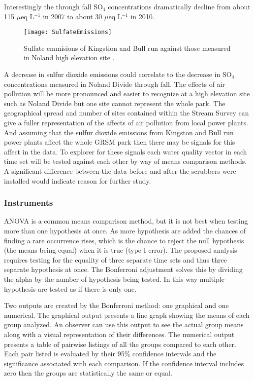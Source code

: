 Interestingly the through fall SO$_4$ concentrations dramatically decline from about 115 $\mu$eq L$^{-1}$ in 2007 to about 30 $\mu$eq L$^{-1}$ in 2010.
\begin{figure}[h!]
  \centering
  \texttt{[image: SulfateEmissions]}\\
  \caption{Sulfate emmisions of Kingstion and Bull run against those measured in Noland high elevation site \citep{annualreport2012}.}\label{fig:sulfateemissions}
\end{figure}
A decrease in sulfur dioxide emissions could correlate to the decrease in SO$_4$ concentrations measured in Noland Divide through fall.
The effects of air pollution will be more pronounced and easier to recognize at a high elevation site such as Noland Divide but one site cannot represent the whole park.
The geographical spread and number of sites contained within the Stream Survey can give a fuller representation of the affects of air pollution from local power plants.
And assuming that the sulfur dioxide emissions from Kingston and Bull run power plants affect the whole GRSM park then there may be signals for this affect in the data.
To explorer for these signals each water quality vector in each time set will be tested against each other by way of means comparison methods.
A significant difference between the data before and after the scrubbers were installed would indicate reason for further study.

\subsubsection{Instruments}
ANOVA is a common means comparison method, but it is not best when testing more than one hypothesis at once.
As more hypothesis are added the chances of finding a rare occurrence rises, which is the chance to reject the null hypothesis (the means being equal) when it is true (type I error).
The proposed analysis requires testing for the equality of three separate time sets and thus three separate hypothesis at once.
The Bonferroni adjustment solves this by dividing the alpha by the number of hypothesis being tested.
In this way multiple hypothesis are tested as if there is only one.

Two outputs are created by the Bonferroni method: one graphical and one numerical.
The graphical output presents a line graph showing the means of each group analyzed.
An observer can use this output to see the actual group means along with a visual representation of their differences.
The numerical output presents a table of pairwise listings of all the groups compared to each other.
Each pair listed is evaluated by their 95$\%$ confidence intervals and the significance associated with each comparison.
If the confidence interval includes zero then the groups are statistically the same or equal.

